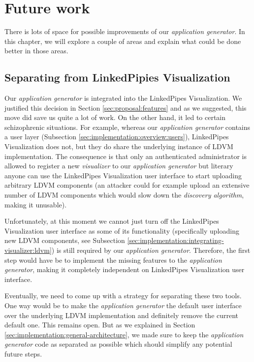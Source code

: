 \chapter{Future work}
\label{chap:future-work}

There is lots of space for possible improvements of our \emph{application generator}. In this chapter, we will explore a couple of areas and explain what could be done better in those areas.

\section{Separating from LinkedPipies Visualization}

Our \emph{application generator} is integrated into the LinkedPipes Visualization. We justified this decision in Section \ref{sec:proposal:features} and as we suggested, this move did save us quite a lot of work. On the other hand, it led to certain schizophrenic situations. For example, whereas our \emph{application generator} contains a user layer (Subsection \ref{sec:implementation:overview:users}), LinkedPipes Visualization does not, but they do share the underlying instance of LDVM implementation. The consequence is that only an authenticated administrator is allowed to register a new \emph{visualizer} to our \emph{application generator} but literary anyone can use the LinkedPipes Visualization user interface to start uploading arbitrary LDVM components (an attacker could for example upload an extensive number of LDVM components which would slow down the \emph{discovery algorithm}, making it unusable).

Unfortunately, at this moment we cannot just turn off the LinkedPipes Visualization user interface as some of its functionality (specifically uploading new LDVM components, see Subsection \ref{sec:implementation:integrating-visualizer:ldvm}) is still required by our \emph{application generator}. Therefore, the first step would have be to implement the missing features to the \emph{application generator}, making it completely independent on LinkedPipes Visualization user interface.

Eventually, we need to come up with a strategy for separating these two tools. One way would be to make the \emph{application generator} the default user interface over the underlying LDVM implementation and definitely remove the current default one. This remains open. But as we explained in Section \ref{sec:implementation:general-architecture}, we made sure to keep the \emph{application generator} code as separated as possible which should simplify any potential future steps. 

